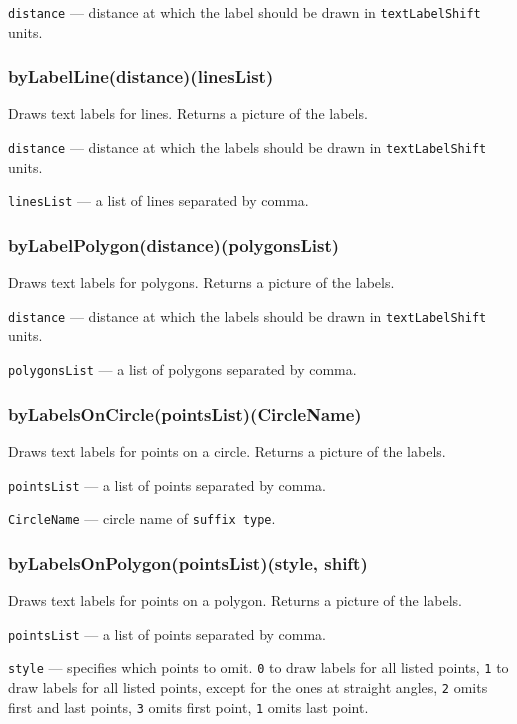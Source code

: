 \documentclass{ltxdoc}
\begin{document}
\texttt{distance} — distance at which the label should be drawn in \texttt{textLabelShift} units.

\subsubsection{byLabelLine(distance)(linesList)}

Draws text labels for lines. Returns a picture of the labels.

\texttt{distance} — distance at which the labels should be drawn in \texttt{textLabelShift} units.

\texttt{linesList} — a list of lines separated by comma.

\subsubsection{byLabelPolygon(distance)(polygonsList)}

Draws text labels for polygons. Returns a picture of the labels.

\texttt{distance} — distance at which the labels should be drawn in \texttt{textLabelShift} units.

\texttt{polygonsList} — a list of polygons separated by comma.


\subsubsection{byLabelsOnCircle(pointsList)(CircleName)}

Draws text labels for points on a circle. Returns a picture of the labels.

\texttt{pointsList} — a list of points separated by comma.

\texttt{CircleName} — circle name of \texttt{suffix type}.

\subsubsection{byLabelsOnPolygon(pointsList)(style, shift)}

Draws text labels for points on a polygon. Returns a picture of the labels.

\texttt{pointsList} — a list of points separated by comma.

\texttt{style} — specifies which points to omit. \texttt{0} to draw labels for all listed points, \texttt{1} to draw labels for all listed points, except for the ones at straight angles, \texttt{2} omits first and last points, \texttt{3} omits first point, \texttt{1} omits last point.
\end{document}
